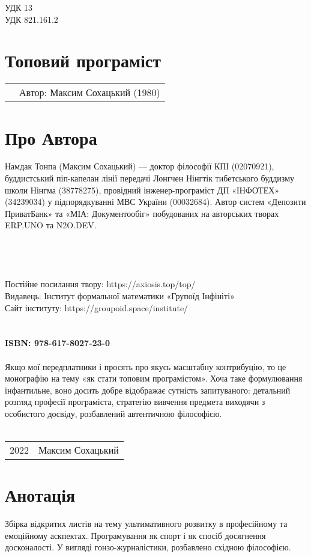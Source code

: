 \noindent УДК 13\\
УДК 821.161.2

\section*{Топовий програміст \top}

\begin{tabular}{ll}
& Автор: Максим Сохацький (1980)\\
\end{tabular}

\section*{Про Автора}
Намдак Тонпа (Максим Сохацький) --- доктор філософії КПІ (02070921),
буддистський піп-капелан лінії передачі
Лонгчен Нінгтік тибетського буддизму школи Нінгма (38778275),
провідний інженер-програміст ДП «ІНФОТЕХ» (34239034)
у підпорядкуванні МВС України (00032684).
Автор систем «Депозити ПриватБанк» та «МІА: Документообіг»
побудованих на авторських творах ERP.UNO та N2O.DEV.
\\
\\
\\
\\
\\
Постійне посилання твору: https://axiosis.top/top/ \\
Видавець: Інститут формальної математики «Групоїд Інфініті» \\
Сайт інституту: https://groupoid.space/institute/ \\
\\
\\
{\bf ISBN: 978-617-8027-23-0 \hspace{2em}}
\\
\\
\small
\indent Якщо мої передплатники і просять про якусь масштабну контрибуцію,
то це монографію на тему «як стати топовим програмістом».
Хоча таке формулювання інфантильне, воно досить добре
відображає сутність запитуваного: детальний розгляд професії
програміста, стратегію вивчення предмета виходячи з особистого
досвіду, розбавлений автентичною філософією.
\\
\\
\begin{tabular}{ll}
\textcopyright{} 2022 & Максим Сохацький
\end{tabular}

\newpage
\section*{Анотація}
Збірка відкритих листів на тему ультимативного розвитку в професійному та емоційному аскпектах. Програмування як спорт і як спосіб досягнення досконалості. У вигляді гонзо-журналістики, розбавлено східною філософією.

